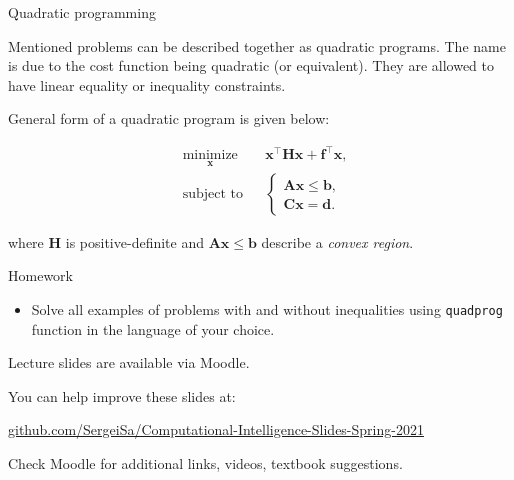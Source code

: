 \documentclass{beamer}
\begin{document}
\begin{frame}{Quadratic programming}
\begin{flushleft}

Mentioned problems can be described together as quadratic programs. The name is due to the cost function being quadratic (or equivalent). They are allowed to have linear equality or inequality constraints. 

\bigskip

General form of a quadratic program is given below:

%
\begin{equation}
\begin{aligned}
& \underset{\mathbf{x}}{\text{minimize}}
& & \mathbf{x}^\top \mathbf{H} \mathbf{x} + \mathbf{f}^\top\mathbf{x}, \\
& \text{subject to}
& & \begin{cases}
    \mathbf{A}\mathbf{x} \leq \mathbf{b}, \\
    \mathbf{C}\mathbf{x} = \mathbf{d}.
    \end{cases}
\end{aligned}
\end{equation}

where $\mathbf{H}$ is positive-definite and $\mathbf{A}\mathbf{x} \leq \mathbf{b}$ describe a \emph{convex region}.

\end{flushleft}
\end{frame}



\begin{frame}{Homework}
\begin{flushleft}

\begin{itemize}
    \item Solve all examples of problems with and without inequalities using \texttt{quadprog} function in the language of your choice.
\end{itemize}

\end{flushleft}
\end{frame}




\begin{frame}
\centerline{Lecture slides are available via Moodle.}
\bigskip
\centerline{You can help improve these slides at:}
\centerline{
\textcolor{blue}{\href{https://github.com/SergeiSa/Computational-Intelligence-Slides-Spring-2021}{github.com/SergeiSa/Computational-Intelligence-Slides-Spring-2021}}
}
\bigskip

\textcolor{black}{}
\bigskip


\centerline{Check Moodle for additional links, videos, textbook suggestions.}
\end{frame}
\end{document}
